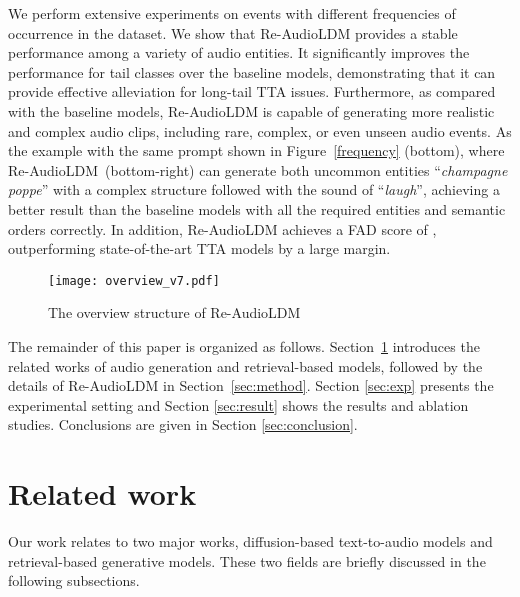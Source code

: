 \documentclass{article}
\begin{document}
We perform extensive experiments on events with different frequencies of occurrence in the dataset. We show that Re-AudioLDM provides a stable performance among a variety of audio entities. It significantly improves the performance for tail classes over the baseline models, demonstrating that it can provide effective alleviation for long-tail TTA issues. Furthermore, as compared with the baseline models, Re-AudioLDM is capable of generating more realistic and complex audio clips, including rare, complex, or even unseen audio events. As the example with the same prompt shown in Figure~\ref{frequency} (bottom), where Re-AudioLDM~(bottom-right) can generate both uncommon entities ``\textit{champagne poppe}'' with a complex structure followed with the sound of ``\textit{laugh}'', achieving a better result than the baseline models with all the required entities and semantic orders correctly. In addition, Re-AudioLDM achieves a FAD score of , outperforming state-of-the-art TTA models by a large margin. 

  

\begin{figure*}[htbp]
    \centering
    \texttt{[image: overview\_v7.pdf]}
    \caption{The overview structure of Re-AudioLDM}
    \label{fig:overview}
\end{figure*}

The remainder of this paper is organized as follows. Section~\ref{sec:related_works} introduces the related works of audio generation and retrieval-based models, followed by the details of Re-AudioLDM in Section~\ref{sec:method}. Section \ref{sec:exp} presents the experimental setting and Section \ref{sec:result} shows the results and ablation studies. Conclusions are given in Section \ref{sec:conclusion}.

\section{Related work}
\label{sec:related_works}
Our work relates to two major works, diffusion-based text-to-audio models and retrieval-based generative models. These two fields are briefly discussed in the following subsections.
\end{document}
